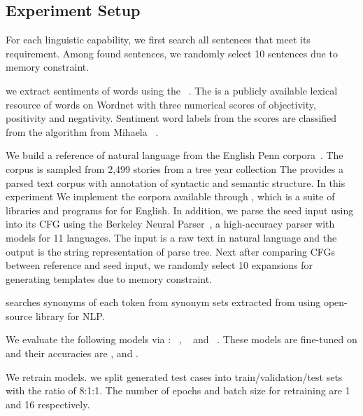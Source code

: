 \subsection{Experiment Setup}
%
%
For each linguistic capability, we first search all sentences that
meet its requirement. Among found sentences, we randomly select 10
sentences due to memory constraint.

%
we extract sentiments of words using the
\Swn~\cite{baccianella2010sentiwordnet}. The \Swn is a publicly
available lexical resource of words on Wordnet with three numerical
scores of objectivity, positivity and negativity. Sentiment word
labels from the scores are classified from the algorithm from Mihaela
\etal~\cite{mihaela2017sentiwordnetlabel}.

%
We build a reference \Cfg of natural language from the English Penn
\Trb corpora~\cite{mitchell1993treebank,nltkTreebankCorporaWebPage}.
The corpus is sampled from 2,499 stories from a tree year \Wsj
collection The \Trb provides a parsed text corpus with annotation of
syntactic and semantic structure. In this experiment We implement the
\trb corpora available through \Nltk, which is a suite of libraries
and programs for \Nlp for English. In addition, we parse the seed
input using into its CFG using the Berkeley Neural
Parser~\cite{kitaev2018constituency, kitaev2019multilingual}, a
high-accuracy parser with models for 11 languages. The input is a raw
text in natural language and the output is the string representation of
parse tree. Next after comparing CFGs between reference and seed input,
we randomly select 10 expansions for generating templates due to
memory constraint.

%
\Model searches synonyms of each token from synonym sets extracted
from \Wrdnt using \Spacy open-source library for NLP.

%
We evaluate the following \sa models via \Model:
\Bert~\cite{devlin2019bert}, \Roberta~\cite{liu2019roberta} and
\Dbert~\cite{sanh2019distilbert}. These models are fine-tuned on \Sstt
and their accuracies are \BertAcc, \RobertaAcc and \DbertAcc.

%
We retrain \sa models. we split \Model generated test cases into
train/validation/test sets with the ratio of 8:1:1. The number of
epochs and batch size for retraining are 1 and 16 respectively.
